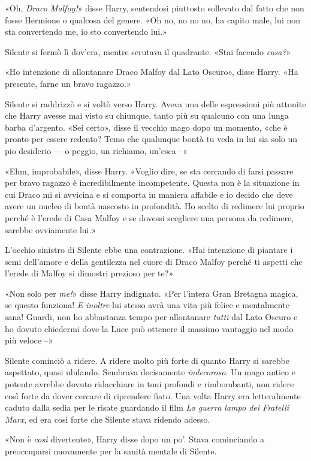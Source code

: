 «Oh, \textit{Draco Malfoy!}» disse Harry, sentendosi piuttosto sollevato dal fatto che non fosse Hermione o qualcosa del genere. «Oh no, no no no, ha capito male, lui non sta convertendo me, io sto convertendo lui.»

Silente si fermò lì dov’era, mentre scrutava il quadrante. «Stai facendo \textit{cosa?}»

«Ho intenzione di allontanare Draco Malfoy dal Lato Oscuro», disse Harry. «Ha presente, farne un bravo ragazzo.»

Silente si raddrizzò e si voltò verso Harry. Aveva una delle espressioni più attonite che Harry avesse mai visto su chiunque, tanto più su qualcuno con una lunga barba d’argento. «Sei certo», disse il vecchio mago dopo un momento, «che è pronto per essere redento? Temo che qualunque bontà tu veda in lui sia solo un pio desiderio — o peggio, un richiamo, un’esca –»

«Ehm, improbabile», disse Harry. «Voglio dire, se sta cercando di farsi passare per bravo ragazzo è incredibilmente incompetente. Questa non è la situazione in cui Draco mi si avvicina e si comporta in maniera affabile e io decido che deve avere un nucleo di bontà nascosto in profondità. Ho scelto di redimere lui proprio perché è l’erede di Casa Malfoy e se dovessi scegliere una persona da redimere, sarebbe ovviamente lui.»

L’occhio sinistro di Silente ebbe una contrazione. «Hai intenzione di piantare i semi dell’amore e della gentilezza nel cuore di Draco Malfoy perché ti aspetti che l’erede di Malfoy si dimostri prezioso per te?»

«Non solo per \textit{me!}» disse Harry indignato. «Per l’intera Gran Bretagna magica, se questo funziona! \textit{E inoltre} lui stesso avrà una vita più felice e mentalmente sana! Guardi, non ho abbastanza tempo per allontanare \textit{tutti} dal Lato Oscuro e ho dovuto chiedermi dove la Luce può ottenere il massimo vantaggio nel modo più veloce –»

Silente cominciò a ridere. A ridere molto più forte di quanto Harry si sarebbe aspettato, quasi ululando. Sembrava decisamente \textit{indecoroso}. Un mago antico e potente avrebbe dovuto ridacchiare in toni profondi e rimbombanti, non ridere così forte da dover cercare di riprendere fiato. Una volta Harry era letteralmente caduto dalla sedia per le risate guardando il film \textit{La guerra lampo dei Fratelli Marx}, ed era così forte che Silente stava ridendo adesso.

«Non è \textit{così} divertente», Harry disse dopo un po’. Stava cominciando a preoccuparsi nuovamente per la sanità mentale di Silente.

